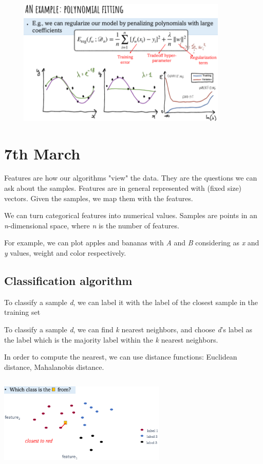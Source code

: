 \documentclass{article}
\begin{document}
\bigskip

\includegraphics[width=12cm, height=6cm]{img/pol_fitting.png}


\newpage


\section*{7th March}

Features are how our algorithms "view" the data. They are the questions we can ask about the samples. Features are in general represented with (fixed size) vectors.
Given the samples, we map them with the features.


We can turn categorical features into numerical values. Samples are points in an \emph{n}-dimensional space, where \emph{n} is the number of features.

For example, we can plot apples and bananas with \emph{A} and \emph{B} considering as \emph{x} and \emph{y} values, weight and color respectively.

\bigskip


\subsection*{Classification algorithm}

\begin{minipage}{0.5\linewidth}
To classify a sample \emph{d}, we can label it with the label of the closest sample in the training set

To classify a sample \emph{d}, we can find \emph{k} nearest neighbors, and choose \emph{d}'s label as the label which is the majority label within the \emph{k} nearest neighbors.

In order to compute the nearest, we can use distance functions: Euclidean distance, Mahalanobis distance.
\end{minipage}
\hfill
\begin{minipage}{0.45\linewidth}
\includegraphics[width=8cm, height=4.5cm]{img/classification.png}
\end{minipage}
\end{document}
